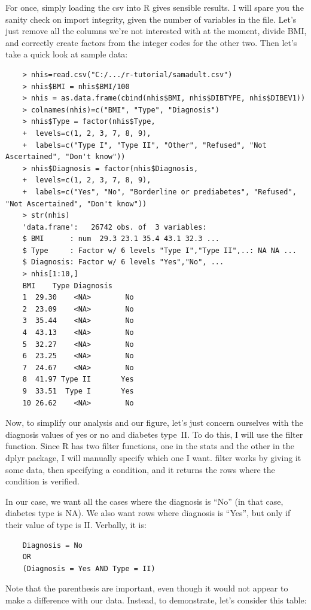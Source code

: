 \documentclass{report}
\newcommand{\code}[1]{\textsf{\ttfamily #1}}
\begin{document}
	For once, simply loading the csv into R gives sensible results. I will spare you the sanity check on import integrity, given the number of variables in the file. Let's just remove all the columns we're not interested with at the moment, divide BMI, and correctly create factors from the integer codes for the other two. Then let's take a quick look at sample data:
	\begin{verbatim}
	> nhis=read.csv("C:/.../r-tutorial/samadult.csv")
	> nhis$BMI = nhis$BMI/100
	> nhis = as.data.frame(cbind(nhis$BMI, nhis$DIBTYPE, nhis$DIBEV1))
	> colnames(nhis)=c("BMI", "Type", "Diagnosis")
	> nhis$Type = factor(nhis$Type, 
	+  levels=c(1, 2, 3, 7, 8, 9), 
	+  labels=c("Type I", "Type II", "Other", "Refused", "Not Ascertained", "Don't know"))
	> nhis$Diagnosis = factor(nhis$Diagnosis, 
	+  levels=c(1, 2, 3, 7, 8, 9), 
	+  labels=c("Yes", "No", "Borderline or prediabetes", "Refused", "Not Ascertained", "Don't know"))
	> str(nhis)
	'data.frame':   26742 obs. of  3 variables:
	$ BMI      : num  29.3 23.1 35.4 43.1 32.3 ...
	$ Type     : Factor w/ 6 levels "Type I","Type II",..: NA NA ...
	$ Diagnosis: Factor w/ 6 levels "Yes","No", ...
	> nhis[1:10,]
	BMI    Type Diagnosis
	1  29.30    <NA>        No
	2  23.09    <NA>        No
	3  35.44    <NA>        No
	4  43.13    <NA>        No
	5  32.27    <NA>        No
	6  23.25    <NA>        No
	7  24.67    <NA>        No
	8  41.97 Type II       Yes
	9  33.51  Type I       Yes
	10 26.62    <NA>        No
	\end{verbatim}
	
	Now, to simplify our analysis and our figure, let's just concern ourselves with the diagnosis values of yes or no and diabetes type~II. To do this, I will use the \code{filter} function. Since R has two \code{filter} functions, one in the \code{stats} and the other in the \code{dplyr} package, I will manually specify which one I want. \code{filter} works by giving it some data, then specifying a condition, and it returns the rows where the condition is verified.
	
	In our case, we want all the cases where the diagnosis is ``No'' (in that case, diabetes type is NA). We also want rows where diagnosis is ``Yes'', but only if their value of type is II. Verbally, it is:
	
	\begin{verbatim}
	Diagnosis = No 
	OR 
	(Diagnosis = Yes AND Type = II)
	\end{verbatim}
	
	Note that the parenthesis are important, even though it would not appear to make a difference with our data. Instead, to demonstrate, let's consider this table:
	
\end{document}
